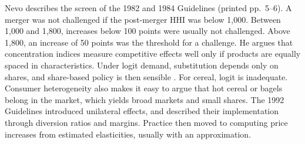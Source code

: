  Nevo describes the screen of the 1982 and 1984 Guidelines (printed
pp.~5--6). A merger was not challenged if the post-merger HHI was below 1,000. Between 1,000 and 1,800, increases below 100 points
were usually not challenged. Above 1,800, an increase of 50 points was the threshold for a challenge. He argues that
concentration indices measure competitive effects well only if products are equally spaced in characteristics. Under
logit demand, substitution depends only on shares, and share-based policy is then sensible \citep{Willig1991}. For
cereal, logit is inadequate. Consumer heterogeneity also makes it easy to argue that hot cereal or bagels belong in
the market, which yields broad markets and small shares. The 1992 Guidelines introduced unilateral effects, and
\citet{Shapiro1996} described their implementation through diversion ratios and margins. Practice then moved to
computing price increases from estimated elasticities, usually with an approximation.

